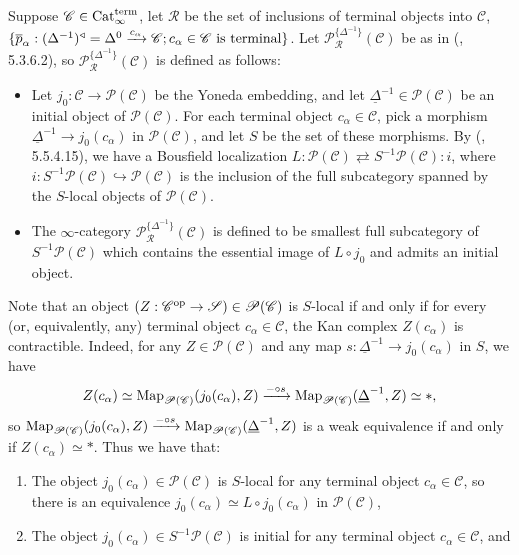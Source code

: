 \documentclass{tac}
\newcommand{\s}[1]{\mathscr{#1}}
\newcommand{\maybehat}[1]{#1} %
\newcommand{\ol}[1]{\overline{#1}}
\newcommand{\tx}[1]{\textnormal{#1}}
\newcommand{\ul}[1]{\underline{#1}}
\begin{document}
\begin{rmk}\label{termtoptrmk} Suppose $\s{C}\in \maybehat{\tx{Cat}}_\infty^\tx{term}$, let $\s{R}$ be the set of inclusions of terminal objects into $\s{C}$, $\{ \ol{p}_\alpha :  (\Delta^{-1})^{\triangleleft} = \Delta^0 \xrightarrow{c_\alpha}\s{C} ; c_\alpha \in\s{C} \tx{ is terminal} \}$. Let $\s{P}^{\{ \Delta^{-1} \}}_{\s{R}}(\s{C})$ be as in (\cite{htt}, 5.3.6.2), so $\s{P}^{\{ \Delta^{-1} \}}_{\s{R}}(\s{C})$ is defined as follows:
\begin{itemize}
\item Let $j_0 : \s{C} \to\s{P}(\s{C})$ be the Yoneda embedding, and let $\ul{\Delta}^{-1} \in \s{P}(\s{C})$ be an initial object of $\s{P}(\s{C})$.  For each terminal object $c_\alpha \in\s{C}$, pick a morphism $\ul{\Delta}^{-1} \to j_0 (c_\alpha)$ in $\s{P}(\s{C})$, and let $S$ be the set of these morphisms.  By (\cite{htt}, 5.5.4.15), we have a Bousfield localization $L: \s{P}(\s{C}) \rightleftarrows S^{-1}\s{P}(\s{C}) : i$,
where $i : S^{-1}\s{P}(\s{C}) \hookrightarrow\s{P}(\s{C})$ is the inclusion of the full subcategory spanned by the $S$-local objects of $\s{P}(\s{C})$.
\item The $\infty$-category $\s{P}^{\{ \Delta^{-1} \}}_{\s{R}}(\s{C})$ is defined to be smallest full subcategory of $S^{-1}\s{P}(\s{C})$ which contains the essential image of $L \circ j_0$ and admits an initial object.
\end{itemize}
Note that an object $(Z : \s{C}^\tx{op} \to \s{S}) \in \s{P}(\s{C})$ is $S$-local if and only if for every (or, equivalently, any) terminal object $c_\alpha \in \s{C}$, the Kan complex $Z(c_\alpha)$ is contractible.  Indeed, for any $Z \in\s{P}(\s{C})$ and any map $s : \ul{\Delta}^{-1} \to j_0 (c_\alpha)$ in $S$, we have 
\[ Z(c_\alpha) \simeq \tx{Map}_{\s{P}(\s{C})} (j_0 (c_\alpha) , Z) \xrightarrow{-\circ s} \tx{Map}_{\s{P}(\s{C})} (\ul{\Delta}^{-1} , Z) \simeq *, \]
so $ \tx{Map}_{\s{P}(\s{C})} (j_0 (c_\alpha) , Z) \xrightarrow{-\circ s} \tx{Map}_{\s{P}(\s{C})} (\ul{\Delta}^{-1} , Z)$ is a weak equivalence if and only if $ Z(c_\alpha) \simeq *$.  Thus we have that:\begin{enumerate}
\item\label{termtoptrmk1} The object $j_0 (c_\alpha) \in \s{P}(\s{C})$ is $S$-local for any terminal object $c_\alpha \in\s{C}$, so there is an equivalence $j_0 (c_\alpha)\simeq L\circ j_0 (c_\alpha)$ in $\s{P}(\s{C})$,
\item\label{termtoptrmk2} The object $j_0 (c_\alpha) \in S^{-1} \s{P}(\s{C})$ is initial for any terminal object $c_\alpha \in\s{C}$, and

\end{enumerate}
\end{rmk}
\end{document}
